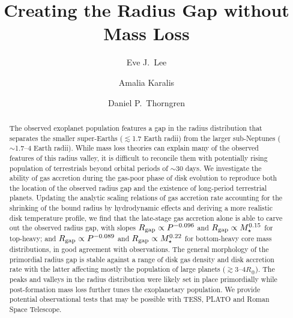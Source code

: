 \documentclass[twocolumn]{aastex631}
\begin{document}
\title{Creating the Radius Gap without Mass Loss}


\author[0000-0002-1228-9820]{Eve J.~Lee}

\author[0000-0003-0525-1805]{Amalia Karalis}

\author[0000-0002-5113-8558]{Daniel P.~Thorngren}

\begin{abstract}
The observed exoplanet population features a gap in the radius distribution that separates the smaller super-Earths ($\lesssim$1.7 Earth radii) from the larger sub-Neptunes ($\sim$1.7--4 Earth radii). While mass loss theories can explain many of the observed features of this radius valley, it is difficult to reconcile them with potentially rising population of terrestrials beyond orbital periods of $\sim$30 days. We investigate the ability of gas accretion during the gas-poor phase of disk evolution to reproduce both the location of the observed radius gap and the existence of long-period terrestrial planets. Updating the analytic scaling relations of gas accretion rate accounting for the shrinking of the bound radius by hydrodynamic effects and deriving a more realistic disk temperature profile, we find that the late-stage gas accretion alone is able to carve out the observed radius gap, with slopes $R_{\rm gap} \propto P^{-0.096}$ and $R_{\rm gap} \propto M_\star^{0.15}$ for top-heavy; and $R_{\rm gap} \propto P^{-0.089}$ and $R_{\rm gap} \propto M_\star^{0.22}$ for bottom-heavy core mass distributions, in good agreement with observations. The general morphology of the primordial radius gap is stable against a range of disk gas density and disk accretion rate with the latter affecting mostly the population of large planets ($\gtrsim$3--4$R_\oplus$). The peaks and valleys in the radius distribution were likely set in place primordially while post-formation mass loss further tunes the exoplanetary population. We provide potential observational tests that may be possible with TESS, PLATO and Roman Space Telescope.
\end{abstract}
\end{document}

